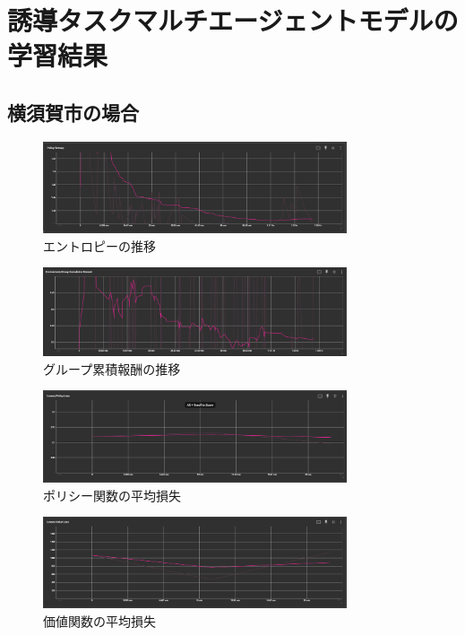 \section{誘導タスクマルチエージェントモデルの学習結果}

\subsection{横須賀市の場合}
\begin{figure}[H] 
  \centering 
  \includegraphics[width=0.8\textwidth]{Figures/Yokosuka-Entropy.png}
  \caption{エントロピーの推移} 
  \label{fig:fig-01}
\end{figure}
\begin{figure}[H] 
  \centering 
  \includegraphics[width=0.8\textwidth]{Figures/Yokosuka-GroupReward.png}
  \caption{グループ累積報酬の推移} 
  \label{fig:fig-01}
\end{figure}
\begin{figure}[H] 
  \centering 
  \includegraphics[width=0.8\textwidth]{Figures/Yokosuka-PolycyLoss.png}
  \caption{ポリシー関数の平均損失} 
  \label{fig:fig-01}
\end{figure}
\begin{figure}[H] 
  \centering 
  \includegraphics[width=0.8\textwidth]{Figures/YokosukaValueLoss.png}
  \caption{価値関数の平均損失} 
  \label{fig:fig-01}
\end{figure}


